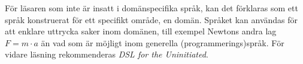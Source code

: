 \documentclass[12pt,a4paper]{article}
\begin{document}
För läsaren som inte är insatt i domänspecifika språk, kan det förklaras som ett språk konstruerat för ett specifikt område, en domän. Språket kan användas för att enklare uttrycka saker inom domänen, till exempel Newtons andra lag $F=m \cdot a$ än vad som är möjligt inom generella (programmerings)språk. För vidare läsning rekommenderas \textit{DSL for the Uninitiated}.\cite{DSLU}


% 
% 
% 
% 
% 
% 
% 
\end{document}
